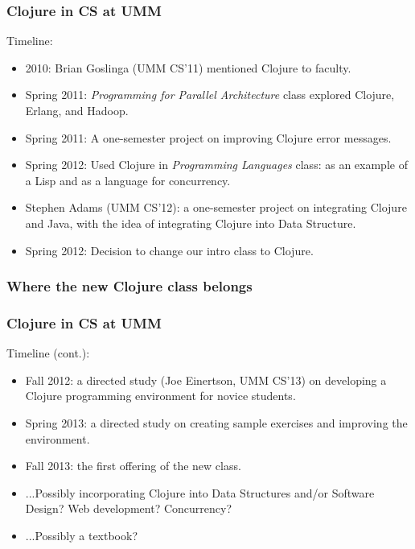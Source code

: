 \documentclass{beamer}
\begin{document}
\begin{frame}
  \frametitle{Clojure in CS at UMM}
Timeline: 
\begin{itemize}
\item 2010: Brian Goslinga (UMM CS'11) mentioned Clojure to faculty.
\item Spring 2011: {\it Programming for Parallel Architecture} class explored Clojure, Erlang, and Hadoop. 
\item Spring 2011:  A one-semester project on improving Clojure error messages. 
\item Spring 2012: Used Clojure in {\it Programming Languages} class: as an example of a Lisp and as a language for concurrency.  
\item Stephen Adams (UMM CS'12): a one-semester project on integrating Clojure and Java, with the idea of integrating Clojure into Data Structure. %
\item Spring 2012: Decision to change our intro class to Clojure. %
\end{itemize}
\end{frame}

\begin{frame}
  \frametitle{Where the new Clojure class belongs}
{\small
{}
}
\end{frame}

\begin{frame}
  \frametitle{Clojure in CS at UMM}
Timeline (cont.):
\begin{itemize} 
\item Fall 2012: a directed study (Joe Einertson, UMM CS'13) on developing a Clojure programming environment for novice students.
\item Spring 2013: a directed study on creating sample exercises and improving the environment. 
\item Fall 2013: the first offering of the new class. 
\item ...Possibly incorporating Clojure into Data Structures and/or Software Design? Web development? Concurrency? 
\item ...Possibly a textbook? 
\end{itemize}
\end{frame}
\end{document}
